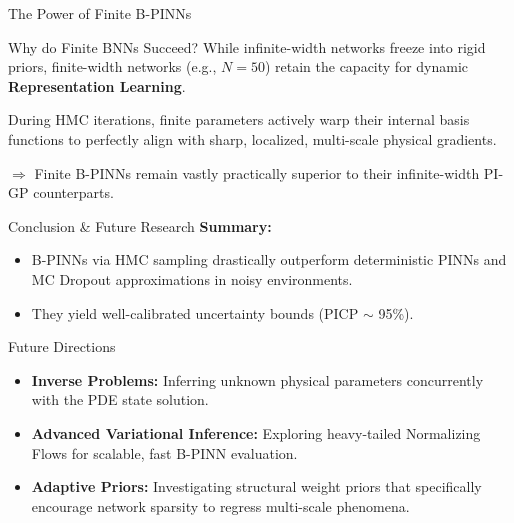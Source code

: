 \documentclass{beamer}
\begin{document}
\begin{frame}{The Power of Finite B-PINNs}
    \begin{block}{Why do Finite BNNs Succeed?}
        While infinite-width networks freeze into rigid priors, finite-width networks (e.g., $N=50$) retain the capacity for dynamic \textbf{Representation Learning}.
    \end{block}
    \vspace{0.3cm}
    During HMC iterations, finite parameters actively warp their internal basis functions to perfectly align with sharp, localized, multi-scale physical gradients. 
    
    $\Rightarrow$ Finite B-PINNs remain vastly practically superior to their infinite-width PI-GP counterparts.
\end{frame}

\begin{frame}{Conclusion \& Future Research}
    \textbf{Summary:}
    \begin{itemize}
        \item B-PINNs via HMC sampling drastically outperform deterministic PINNs and MC Dropout approximations in noisy environments.
        \item They yield well-calibrated uncertainty bounds (PICP $\sim$ 95\%).
    \end{itemize}
    
    \vspace{0.2cm}
    \begin{block}{Future Directions}
        \begin{itemize}
            \item \textbf{Inverse Problems:} Inferring unknown physical parameters concurrently with the PDE state solution.
            \item \textbf{Advanced Variational Inference:} Exploring heavy-tailed Normalizing Flows for scalable, fast B-PINN evaluation.
            \item \textbf{Adaptive Priors:} Investigating structural weight priors that specifically encourage network sparsity to regress multi-scale phenomena.
        \end{itemize}
    \end{block}
\end{frame}
\end{document}
